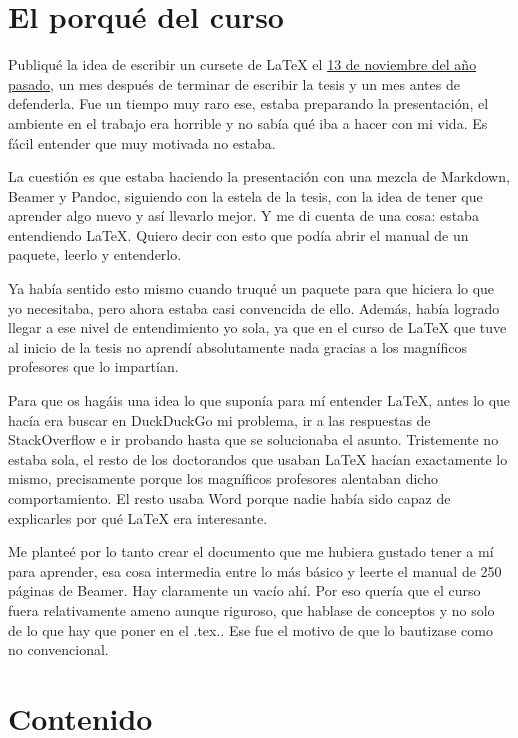\section*{El porqué del curso}\label{sec:porque}

Publiqué la idea de escribir un cursete de LaTeX el
\href{https://ondahostil.wordpress.com/2016/11/13/proyecto-curso-no-convencional-de-latex/}{13
de noviembre del año pasado}, un mes después de terminar de escribir la
tesis y un mes antes de defenderla. Fue un tiempo muy raro ese, estaba
preparando la presentación, el ambiente en el trabajo era horrible y no
sabía qué iba a hacer con mi vida. Es fácil entender que muy motivada no
estaba.

La cuestión es que estaba haciendo la presentación con una mezcla de
Markdown, Beamer y Pandoc, siguiendo con la estela de la tesis, con la
idea de tener que aprender algo nuevo y así llevarlo mejor. Y me di
cuenta de una cosa: estaba entendiendo LaTeX. Quiero decir con esto que
podía abrir el manual de un paquete, leerlo y entenderlo.

Ya había sentido esto mismo cuando truqué un paquete para que hiciera lo
que yo necesitaba, pero ahora estaba casi convencida de ello. Además,
había logrado llegar a ese nivel de entendimiento yo sola, ya que en el
curso de LaTeX que tuve al inicio de la tesis no aprendí absolutamente
nada gracias a los magníficos profesores que lo impartían.

Para que os hagáis una idea lo que suponía para mí entender LaTeX, antes
lo que hacía era buscar en DuckDuckGo mi problema, ir a las respuestas
de StackOverflow e ir probando hasta que se solucionaba el asunto.
Tristemente no estaba sola, el resto de los doctorandos que usaban LaTeX
hacían exactamente lo mismo, precisamente porque los magníficos
profesores alentaban dicho comportamiento. El resto usaba Word porque
nadie había sido capaz de explicarles por qué LaTeX era interesante.

Me planteé por lo tanto crear el documento que me hubiera gustado tener
a mí para aprender, esa cosa intermedia entre lo más básico y leerte el
manual de 250 páginas de Beamer. Hay claramente un vacío ahí. Por eso
quería que el curso fuera relativamente ameno aunque riguroso, que
hablase de conceptos y no solo de lo que hay que poner en el .tex.. Ese
fue el motivo de que lo bautizase como no convencional.

\section*{Contenido}\label{sec:contenido}

